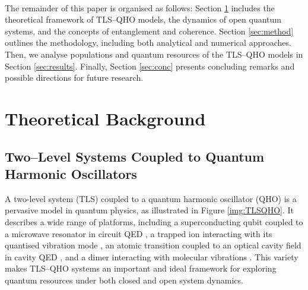 \documentclass[11pt]{article}
\begin{document}
\\
The remainder of this paper is organised as follows: Section \ref{sec:theory} includes the theoretical framework of TLS--QHO models, the dynamics of open quantum systems, and the concepts of entanglement and coherence. Section \ref{sec:method} outlines the methodology, including both analytical and numerical approaches. Then, we analyse populations and quantum resources of the TLS--QHO models in Section \ref{sec:results}. Finally, Section  \ref{sec:conc} presents concluding remarks and possible directions for future research.


\newpage

\section{Theoretical Background} \label{sec:theory}



\subsection{Two--Level Systems Coupled to Quantum Harmonic Oscillators} \label{sec:theory_sub_TLSQHO}

A two-level system (TLS) coupled to a quantum harmonic oscillator (QHO) is a pervasive model in quantum physics, as illustrated in Figure \ref{img:TLSQHO}. It describes a wide range of platforms, including a superconducting qubit coupled to a microwave resonator in circuit QED \cite{Context2024-CircuitQED}, a trapped ion interacting with its quantised vibration mode \cite{Context1992-Trapped_ions}, an atomic transition coupled to an optical cavity field in cavity QED \cite{Context2024-CQED_JCM}, and a dimer interacting with molecular vibrations \cite{ExVib2014-Alexandra}. This variety makes TLS–QHO systems an important and ideal framework for exploring quantum resources under both closed and open system dynamics.\\
\end{document}
